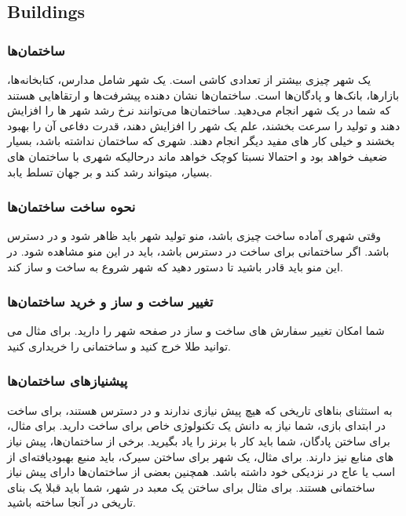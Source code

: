 \documentclass[]{article}
\begin{document}
\subsection*{{\titr Buildings}}

\subsubsection*{{\titr ساختمان‌ها}}
یک شهر چیزی بیشتر از تعدادی کاشی است. یک شهر شامل مدارس، کتابخانه‌ها، بازارها، بانک‌ها و پادگان‌ها است. ساختمان‌ها نشان دهنده پیشرفت‌ها و ارتقا‌هایی هستند که شما در یک شهر انجام می‌دهید. 
ساختمان‌ها می‌توانند نرخ رشد شهر ها را افزایش دهند و تولید را سرعت بخشند، علم یک شهر را افزایش دهند، قدرت دفاعی آن را بهبود بخشند و خیلی کار های مفید دیگر انجام دهند.
شهری که ساختمان نداشته باشد‌، بسیار ضعیف خواهد بود و احتمالا نسبتا کوچک خواهد ماند درحالیکه شهری با ساختمان های بسیار، میتواند رشد کند و بر جهان تسلط یابد.


\subsubsection*{{\titr نحوه ساخت ساختمان‌ها}}
وقتی شهری آماده ساخت چیزی باشد، منو تولید شهر باید ظاهر شود و در دسترس باشد. اگر ساختمانی برای ساخت در دسترس باشد، باید در این منو مشاهده شود. در این منو باید قادر باشید تا دستور دهید که شهر شروع به ساخت و ساز کند.


\subsubsection*{{\titr تغییر ساخت و ساز و خرید ساختمان‌ها}}
شما امکان تغییر سفارش های ساخت و ساز در صفحه شهر را دارید. برای مثال می توانید طلا خرج کنید و ساختمانی را خریداری کنید.


\subsubsection*{{\titr پیشنیاز‌های ساختمان‌ها}}
به استثنای بناهای تاریخی که هیچ پیش نیازی ندارند و در دسترس هستند، برای ساخت در ابتدای بازی، شما نیاز به دانش یک تکنولوژی خاص برای ساخت دارید. برای مثال، برای ساختن پادگان، شما باید کار با برنز را یاد بگیرید.
برخی از ساختمان‌ها، پیش نیاز های منابع نیز دارند. برای مثال، یک شهر برای ساختن سیرک، باید منبع بهبودیافته‌ای از اسب یا عاج در نزدیکی خود داشته باشد.
همچنین بعضی از ساختمان‌ها دارای پیش نیاز ساختمانی هستند. برای مثال برای ساختن یک معبد در شهر، شما باید قبلا یک بنای تاریخی در آنجا ساخته باشید.
\end{document}
